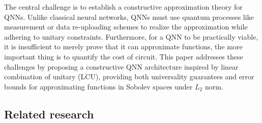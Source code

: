 \documentclass{article}
\theoremstyle{plain}
\theoremstyle{definition}
\theoremstyle{remark}
\begin{document}
The central challenge is to establish a constructive approximation theory for QNNs. Unlike classical neural networks, QNNs must use quantum processes like measurement or data re-uploading schemes to realize the approximation while adhering to unitary constraints. Furthermore, for a QNN to be practically viable, it is insufficient to merely prove that it can approximate functions, the more important thing is to quantify the cost of circuit. This paper addresses these challenges by proposing a constructive QNN architecture inspired by linear combination of unitary (LCU), providing both universality guarantees and error bounds for approximating functions in Sobolev spaces under $L_2$ norm.


\subsection{Related research}
\end{document}
